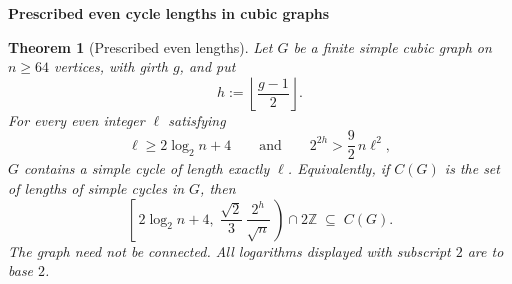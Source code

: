 \documentclass[11pt,a4paper]{article}
\newtheorem{theorem}{Theorem}
\begin{document}
\begin{center}
  {\Large\bfseries Prescribed even cycle lengths in cubic graphs}
\end{center}
\vspace{0.2em}

\begin{theorem}[Prescribed even lengths]\label{thm:main}
Let $G$ be a finite simple cubic graph on $n\ge64$ vertices, with girth
$g$, and put
\[
  h:=\left\lfloor\frac{g-1}{2}\right\rfloor.
\]
For every even integer $\ell$ satisfying
\begin{equation}\label{eq:hypotheses}
  \ell\ge 2\log_2 n+4
  \qquad\text{and}\qquad
  2^{2h}>\frac92\,n\ell^2,
\end{equation}
$G$ contains a simple cycle of length exactly $\ell$.
Equivalently, if $C(G)$ is the set of lengths of simple cycles in $G$,
then
\begin{equation}\label{eq:interval}
  \left[\,2\log_2 n+4,\;
    \frac{\sqrt2}{3}\,\frac{2^h}{\sqrt n}\,\right)
  \cap 2\mathbb Z
  \;\subseteq\; C(G).
\end{equation}
The graph need not be connected. All logarithms displayed with
subscript $2$ are to base $2$.
\end{theorem}
\end{document}
